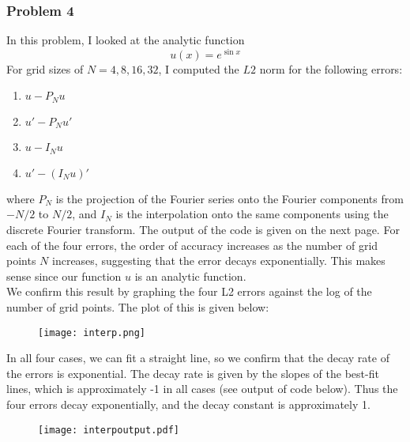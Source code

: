 \documentclass[12pt]{article}
\begin{document}
\subsubsection*{Problem 4}
In this problem, I looked at the analytic function
\[
u(x) = e^{\sin x}
\]
For grid sizes of $N = 4, 8, 16, 32$, I computed the $L2$ norm for the following errors:
\begin{enumerate}
	\item $u - P_N u$
	\item $u' - P_N u'$
	\item $u - I_N u$
	\item $u' - (I_N u)'$
\end{enumerate}
where $P_N$ is the projection of the Fourier series onto the Fourier components from $-N/2$ to $N/2$, and $I_N$ is the interpolation onto the same components using the discrete Fourier transform. The output of the code is given on the next page. For each of the four errors, the order of accuracy increases as the number of grid points $N$ increases, suggesting that the error decays exponentially. This makes sense since our function $u$ is an analytic function. \\

We confirm this result by graphing the four L2 errors against the log of the number of grid points. The plot of this is given below:

\begin{figure}[H]
\texttt{[image: interp.png]}
\end{figure}

In all four cases, we can fit a straight line, so we confirm that the decay rate of the errors is exponential. The decay rate is given by the slopes of the best-fit lines, which is approximately -1 in all cases (see output of code below). Thus the four errors decay exponentially, and the decay constant is approximately 1.

\begin{figure}[H]
\texttt{[image: interpoutput.pdf]}
\end{figure}
\end{document}

